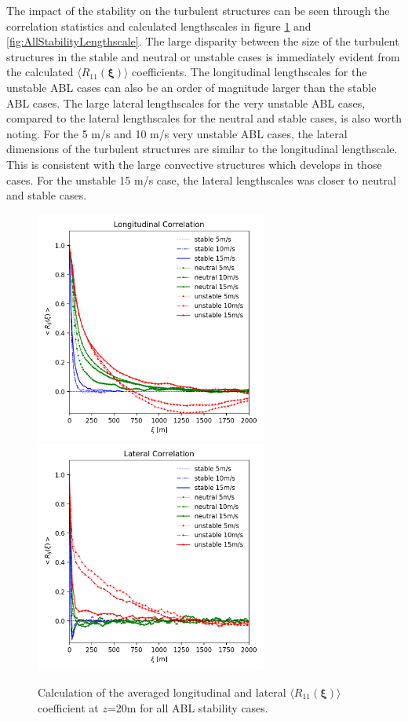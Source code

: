 The impact of the stability on the turbulent structures can be seen
through the correlation statistics and calculated lengthscales in
figure \ref{fig:AllStabilityRij} and
\ref{fig:AllStabilityLengthscale}.  The large disparity between the
size of the turbulent structures in the stable and neutral or unstable
cases is immediately evident from the calculated $\langle
R_{11}(\boldsymbol{\xi})\rangle$ coefficients.  The longitudinal
lengthscales for the unstable ABL cases can also be an order of
magnitude larger than the stable ABL cases.  The large lateral
lengthscales for the very unstable ABL cases, compared to the lateral
lengthscales for the neutral and stable cases, is also worth noting.
For the 5 m/s and 10 m/s very unstable ABL cases, the lateral
dimensions of the turbulent structures are similar to the longitudinal
lengthscale.  This is consistent with the large convective structures
which develops in those cases.  For the unstable 15 m/s case, the
lateral lengthscales was closer to neutral and stable cases.  

\begin{figure}[hbt!]
  \centering
  \includegraphics[width=3in]{figures/AllStability_Rij_Longitudinal.png}
  \includegraphics[width=3in]{figures/AllStability_Rij_Lateral.png}
  \caption{ \label{fig:AllStabilityRij} Calculation of the averaged
    longitudinal and lateral $\langle R_{11}(\boldsymbol{\xi})\rangle$
    coefficient at $z$=20m for all ABL stability cases.}
\end{figure}

